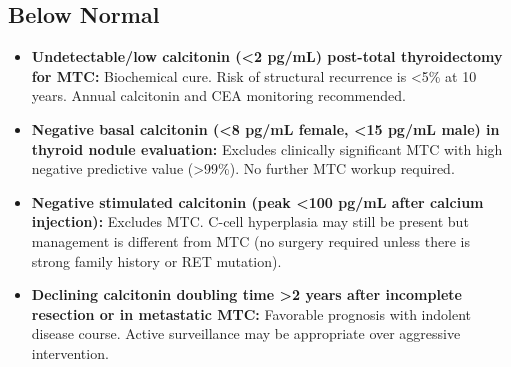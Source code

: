 \subsection*{Below Normal}
\begin{itemize}
  \item \textbf{Undetectable/low calcitonin (<2 pg/mL) post-total thyroidectomy for MTC:} Biochemical cure. Risk of structural recurrence is <5\% at 10 years. Annual calcitonin and CEA monitoring recommended.
  \item \textbf{Negative basal calcitonin (<8 pg/mL female, <15 pg/mL male) in thyroid nodule evaluation:} Excludes clinically significant MTC with high negative predictive value (>99\%). No further MTC workup required.
  \item \textbf{Negative stimulated calcitonin (peak <100 pg/mL after calcium injection):} Excludes MTC. C-cell hyperplasia may still be present but management is different from MTC (no surgery required unless there is strong family history or RET mutation).
  \item \textbf{Declining calcitonin doubling time >2 years after incomplete resection or in metastatic MTC:} Favorable prognosis with indolent disease course. Active surveillance may be appropriate over aggressive intervention.
\end{itemize}

